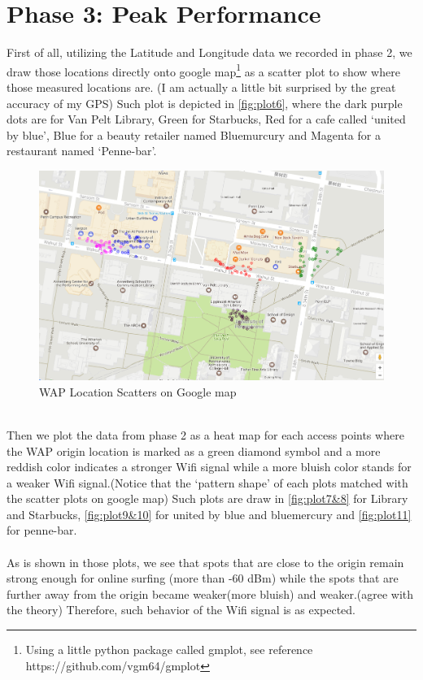 \documentclass[usletter,12pt]{article}
\begin{document}
\section{Phase 3: Peak Performance}
First of all, utilizing the Latitude and Longitude data we recorded in phase 2, we draw those locations directly onto google map\footnote{Using a little python package called gmplot, see reference https://github.com/vgm64/gmplot} as a scatter plot to show where those measured locations are. (I am actually a little bit surprised by the great accuracy of my GPS) Such plot is depicted in \autoref{fig:plot6}, where the dark purple dots are for Van Pelt Library, Green for Starbucks, Red for a cafe called `united by blue', Blue for a beauty retailer named Bluemurcury and Magenta for a restaurant named `Penne-bar'.
\begin{figure}[!h]
	\centering
	\includegraphics[width=1\linewidth]{Googlescatter.png}
	\caption{WAP Location Scatters on Google map}
\label{fig:plot6}
\end{figure}
\\
Then we plot the data from phase 2 as a heat map for each access points where the WAP origin location is marked as a green diamond symbol and a more reddish color indicates a stronger Wifi signal while a more bluish color stands for a weaker Wifi signal.(Notice that the `pattern shape' of each plots matched with the scatter plots on google map) Such plots are draw in \autoref{fig:plot7&8} for Library and Starbucks, \autoref{fig:plot9&10} for united by blue and bluemercury and \autoref{fig:plot11} for penne-bar.\\\\
As is shown in those plots, we see that spots that are close to the origin remain strong enough for online surfing (more than -60 dBm) while the spots that are further away from the origin became weaker(more bluish) and weaker.(agree with the theory) Therefore, such behavior of the Wifi signal is as expected.
\end{document}
